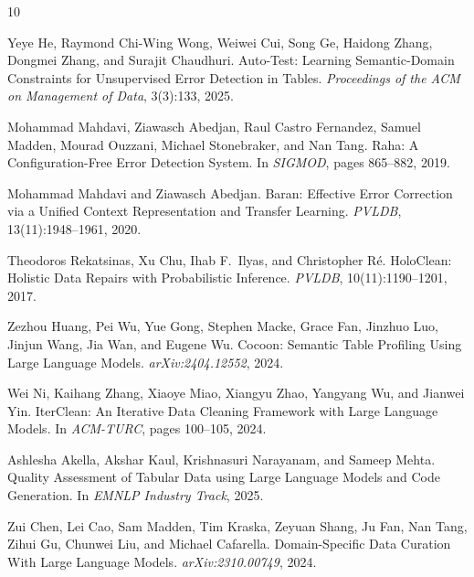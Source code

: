 \documentclass{article}
\begin{document}

\begin{thebibliography}{10}

Yeye He, Raymond Chi-Wing Wong, Weiwei Cui, Song Ge, Haidong Zhang, Dongmei Zhang, and Surajit Chaudhuri.
\newblock Auto-Test: Learning Semantic-Domain Constraints for Unsupervised Error Detection in Tables.
\newblock \emph{Proceedings of the ACM on Management of Data}, 3(3):133, 2025.

Mohammad Mahdavi, Ziawasch Abedjan, Raul Castro Fernandez, Samuel Madden, Mourad Ouzzani, Michael Stonebraker, and Nan Tang.
\newblock Raha: A Configuration-Free Error Detection System.
\newblock In \emph{SIGMOD}, pages 865--882, 2019.

Mohammad Mahdavi and Ziawasch Abedjan.
\newblock Baran: Effective Error Correction via a Unified Context Representation and Transfer Learning.
\newblock \emph{PVLDB}, 13(11):1948--1961, 2020.

Theodoros Rekatsinas, Xu Chu, Ihab F.~Ilyas, and Christopher R{\'e}.
\newblock HoloClean: Holistic Data Repairs with Probabilistic Inference.
\newblock \emph{PVLDB}, 10(11):1190--1201, 2017.

Zezhou Huang, Pei Wu, Yue Gong, Stephen Macke, Grace Fan, Jinzhuo Luo, Jinjun Wang, Jia Wan, and Eugene Wu.
\newblock Cocoon: Semantic Table Profiling Using Large Language Models.
\newblock \emph{arXiv:2404.12552}, 2024.

Wei Ni, Kaihang Zhang, Xiaoye Miao, Xiangyu Zhao, Yangyang Wu, and Jianwei Yin.
\newblock IterClean: An Iterative Data Cleaning Framework with Large Language Models.
\newblock In \emph{ACM-TURC}, pages 100--105, 2024.

Ashlesha Akella, Akshar Kaul, Krishnasuri Narayanam, and Sameep Mehta.
\newblock Quality Assessment of Tabular Data using Large Language Models and Code Generation.
\newblock In \emph{EMNLP Industry Track}, 2025.

Zui Chen, Lei Cao, Sam Madden, Tim Kraska, Zeyuan Shang, Ju Fan, Nan Tang, Zihui Gu, Chunwei Liu, and Michael Cafarella.
\newblock Domain-Specific Data Curation With Large Language Models.
\newblock \emph{arXiv:2310.00749}, 2024.

\end{thebibliography}
\end{document}
